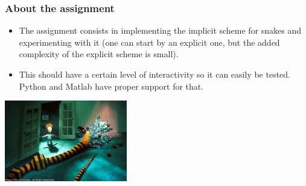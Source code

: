 \documentclass[10pt]{beamer}
\begin{document}
\begin{frame}
  \frametitle{About the assignment}
  \begin{itemize}
  \item The assignment consists in implementing the implicit scheme
    for snakes and experimenting with it (one can start by an explicit
    one, but the added complexity of the explicit scheme is small).
  \item This should have a certain level of interactivity so it can
    easily be tested. Python and Matlab have proper support for that.
  \end{itemize}
  \begin{center}
    \includegraphics[width=0.4\textwidth]{IMAGES/xmastreesnake}
  \end{center}
\end{frame}



\end{document}
